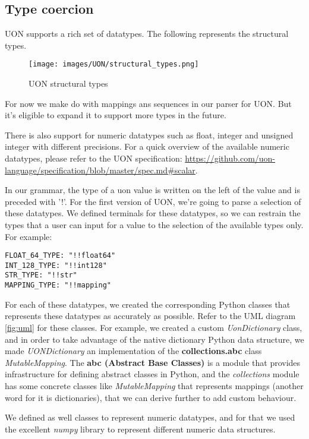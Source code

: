 \documentclass[12pt]{article}
\begin{document}
\subsection{Type coercion}
UON supports a rich set of datatypes. The following represents the structural types.

\begin{figure}[ht!]
 	\centering
 	\caption{UON structural types}
 	\texttt{[image: images/UON/structural\_types.png]}
 	\label{lab:perceptron}
\end{figure}

For now we make do with mappings ans sequences in our parser for UON. But it's eligible to expand it to support more types in the future.

There is also support for numeric datatypes such as float, integer and unsigned integer with different precisions. For a quick overview of the available numeric datatypes, please refer to the UON specification: \url{https://github.com/uon-language/specification/blob/master/spec.md#scalar}.

In our grammar, the type of a uon value is written on the left of the value and is preceded with '!'. For the first version of UON, we're going to parse a selection of these datatypes. We defined terminals for these datatypes, so we can restrain the types that a user can input for a value to the selection of the available types only.
For example:
\begin{lstlisting}
FLOAT_64_TYPE: "!!float64"
INT_128_TYPE: "!!int128"
STR_TYPE: "!!str"
MAPPING_TYPE: "!!mapping"
\end{lstlisting}

For each of these datatypes, we created the corresponding Python classes that represents these datatypes as accurately as possible. Refer to the UML diagram \ref{fig:uml} for these classes. For example, we created a custom \emph{UonDictionary} class, and in order to take advantage of the native dictionary Python data structure, we made \emph{UONDictionary} an implementation of the \textbf{collections.abc} class \emph{MutableMapping}. The \textbf{abc (Abstract Base Classes)} is a module that provides infrastructure for defining abstract classes in Python, and the \emph{collections} module has some concrete classes like \emph{MutableMapping} that represents mappings (another word for it is dictionaries), that we can derive further to add custom behaviour.

We defined as well classes to represent numeric datatypes, and for that we used the excellent \emph{numpy} library to represent different numeric data structures.
\end{document}
